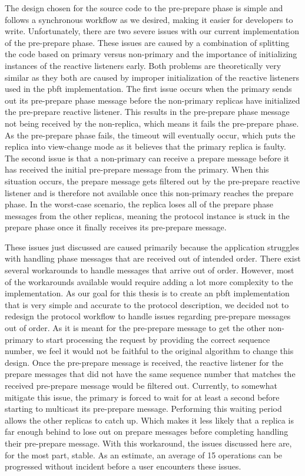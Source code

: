 The design chosen for the source code to the pre-prepare phase is simple and follows a synchronous workflow as we desired, making it easier for developers to write. Unfortunately, there are two severe issues with our current implementation of the pre-prepare phase. These issues are caused by a combination of splitting the code based on primary versus non-primary and the importance of initializing instances of the reactive listeners early. Both problems are theoretically very similar as they both are caused by improper initialization of the reactive listeners used in the \ac{pbft} implementation. The first issue occurs when the primary sends out its pre-prepare phase message before the non-primary replicas have initialized the pre-prepare reactive listener. This results in the pre-prepare phase message not being received by the non-replica, which means it fails the pre-prepare phase. As the pre-prepare phase fails, the timeout will eventually occur, which puts the replica into view-change mode as it believes that the primary replica is faulty. The second issue is that a non-primary can receive a prepare message before it has received the initial pre-prepare message from the primary. When this situation occurs, the prepare message gets filtered out by the pre-prepare reactive listener and is therefore not available once this non-primary reaches the prepare phase. In the worst-case scenario, the replica loses all of the prepare phase messages from the other replicas, meaning the protocol instance is stuck in the prepare phase once it finally receives its pre-prepare message.

These issues just discussed are caused primarily because the application struggles with handling phase messages that are received out of intended order. There exist several workarounds to handle messages that arrive out of order. However, most of the workarounds available would require adding a lot more complexity to the implementation. As our goal for this thesis is to create an \ac{pbft} implementation that is very simple and accurate to the protocol description, we decided not to redesign the protocol workflow to handle issues regarding pre-prepare messages out of order. As it is meant for the pre-prepare message to get the other non-primary to start processing the request by providing the correct sequence number, we feel it would not be faithful to the original algorithm to change this design. Once the pre-prepare message is received, the reactive listener for the prepare messages that did not have the same sequence number that matches the received pre-prepare message would be filtered out. Currently, to somewhat mitigate this issue, the primary is forced to wait for at least a second before starting to multicast its pre-prepare message. Performing this waiting period allows the other replicas to catch up. Which makes it less likely that a replica is far enough behind to lose out on prepare messages before completing handling their pre-prepare message. With this workaround, the issues discussed here are, for the most part, stable. As an estimate, an average of 15 operations can be progressed without incident before a user encounters these issues.



